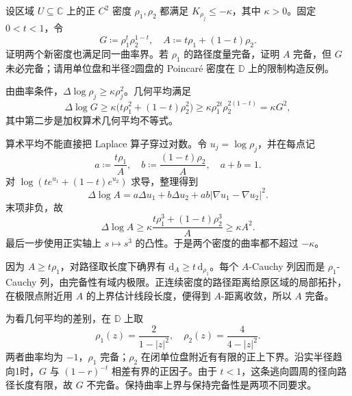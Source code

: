 \begin{exercise}[密度平均与曲率界]\label{b3:ex:14-2}
设区域 \(U\subseteq\mathbb C\) 上的正 \(C^2\) 密度 \(\rho_1,\rho_2\) 都满足 \(K_{\rho_j}\le-\kappa\)，其中 \(\kappa>0\)。固定 \(0<t<1\)，令
\[
 G\coloneqq\rho_1^t\rho_2^{1-t},\quad
 A\coloneqq t\rho_1+(1-t)\rho_2.
\]
证明两个新密度也满足同一曲率界。若 \(\rho_1\) 的路径度量完备，证明 \(A\) 完备，但 \(G\) 未必完备；请用单位盘和半径2圆盘的 Poincaré 密度在 \(\mathbb D\) 上的限制构造反例。
\end{exercise}
\begin{solution}
由曲率条件，\(\Delta\log\rho_j\ge\kappa\rho_j^2\)。几何平均满足
\[
 \Delta\log G
 \ge\kappa\bigl(t\rho_1^2+(1-t)\rho_2^2\bigr)
 \ge\kappa\rho_1^{2t}\rho_2^{2(1-t)}
 =\kappa G^2,
\]
其中第二步是加权算术几何平均不等式。

算术平均不能直接把 Laplace 算子穿过对数。令 \(u_j=\log\rho_j\)，并在每点记
\[
 a\coloneqq\frac{t\rho_1}{A},\quad
 b\coloneqq\frac{(1-t)\rho_2}{A},\quad a+b=1.
\]
对 \(\log(t e^{u_1}+(1-t)e^{u_2})\) 求导，整理得到
\[
 \Delta\log A
 =a\Delta u_1+b\Delta u_2
  +ab|\nabla u_1-\nabla u_2|^2.
\]
末项非负，故
\[
 \Delta\log A
 \ge\kappa\frac{t\rho_1^3+(1-t)\rho_2^3}{A}
 \ge\kappa A^2.
\]
最后一步使用正实轴上 \(s\mapsto s^3\) 的凸性。于是两个密度的曲率都不超过 \(-\kappa\)。

因为 \(A\ge t\rho_1\)，对路径取长度下确界有 \(\mathrm d_A\ge t\,\mathrm d_{\rho_1}\)。每个 \(A\)-Cauchy 列因而是 \(\rho_1\)-Cauchy 列，由完备性有域内极限。正连续密度的路径距离给原区域的局部拓扑，在极限点附近用 \(A\) 的上界估计线段长度，便得到 \(A\)-距离收敛，所以 \(A\) 完备。

为看几何平均的差别，在 \(\mathbb D\) 上取
\[
 \rho_1(z)=\frac2{1-|z|^2},\quad
 \rho_2(z)=\frac4{4-|z|^2}.
\]
两者曲率均为 \(-1\)，\(\rho_1\) 完备；\(\rho_2\) 在闭单位盘附近有有限的正上下界。沿实半径趋向1时，\(G\) 与 \((1-r)^{-t}\) 相差有界的正因子。由于 \(t<1\)，这条逃向圆周的径向路径长度有限，故 \(G\) 不完备。保持曲率上界与保持完备性是两项不同要求。
\end{solution}

